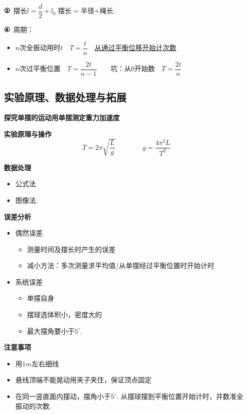 \textbf{②}\ 摆长\quad $l=\dfrac{d}{2}+l_0$
摆长$=$半径$+$绳长.

\textbf{④}\ 周期：
\begin{itemize}
\item $n$次全振动用时$t$　$T=\dfrac{t}{n}$　\underline{从通过平衡位移开始计次数} %
\item $n$次过平衡位置　$T=\dfrac{2t}{n-1}$　　坑：从$0$开始数　$T=\dfrac{2t}{n}$
\end{itemize}

\subsection{实验原理、数据处理与拓展}
\textbf{探究单摆的运动\quad 用单摆测定重力加速度}

\textbf{实验原理与操作}
\[ T=2\pi\sqrt{\frac{L}{g}}\qquad\qquad g=\frac{4\pi^{2}L}{T^{2}} \]

\textbf{数据处理}
\begin{itemize}
\item 公式法
\item 图像法.
\end{itemize}

\textbf{误差分析}
\begin{itemize}
\item 偶然误差.
 \begin{itemize}
 \item 测量时间及摆长时产生的误差
 \item 减小方法：多次测量求平均值/从单摆经过平衡位置时开始计时
 \end{itemize}
\item 系统误差
 \begin{itemize}
 \item 单摆自身
 \item 摆球选体积小，密度大的
 \item 最大摆角要小于$5^\circ$.
 \end{itemize}
\end{itemize}

\textbf{注意事项}
\begin{itemize}
\item 用$1\unit{m}$左右细线
\item 悬线顶端不能晃动用夹子夹住，保证顶点固定
\item 在同一竖直面内摆动，摆角小于$5^\circ$. 从摆球摆到平衡位置开始计时，并数准全振动的次数.
\end{itemize}

